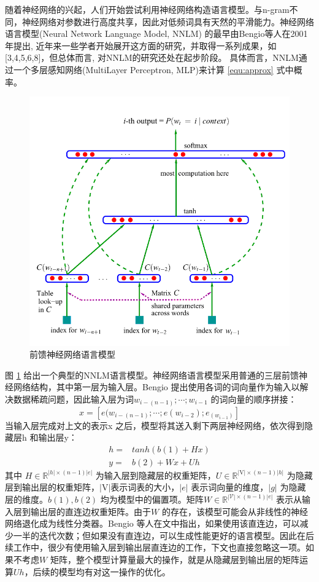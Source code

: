 \documentclass[12pt,a4paper]{article}
\begin{document}
随着神经网络的兴起，人们开始尝试利用神经网络构造语言模型。与n-gram不同，神经网络对参数进行高度共享，因此对低频词具有天然的平滑能力。神经网络语言模型(Neural Network Language Model, NNLM) 的最早由Bengio等人在2001年提出\cite{DBLP:conf/nips/BengioDV00}, 近年来一些学者开始展开这方面的研究，并取得一系列成果，如[3,4,5,6,8]，但总体而言, 对NNLM的研究还处在起步阶段。
具体而言，NNLM通过一个多层感知网络(MultiLayer Perceptron, MLP)来计算 \ref{equ:approx} 式中概率。
\begin{figure}
  \centering
  \includegraphics[width=0.7\linewidth]{./figures/nplm.png}
  \caption{前馈神经网络语言模型}\label{fig:nplm}
\end{figure}
图 \ref{fig:nplm} 给出一个典型的NNLM语言模型。神经网络语言模型采用普通的三层前馈神经网络结构，其中第一层为输入层。Bengio 提出使用各词的词向量作为输入以解决数据稀疏问题，因此输入层为词$w_{i-(n-1)}; \cdots;w_{i-1} $ 的词向量的顺序拼接：
\begin{equation}\label{equ:we}
  x = [e(w_{i-(n-1)}; \cdots ; e(w_{i-2}); e_{(w_{i-1})}]
\end{equation}
当输入层完成对上文的表示x 之后，模型将其送入剩下两层神经网络，依次得到隐藏层h 和输出层y：
\begin{equation}\label{equ:all_nplm}
\begin{split}
h =& tanh(b(1) + Hx) \\
y =& b(2) +Wx + Uh
\end{split}
\end{equation}
其中 $H \in \mathbb{R}^{|h| \times (n-1)|e|}$ 为输入层到隐藏层的权重矩阵，$U \in \mathbb{R}^{|\mathrm{V}|\times (n-1)|h|}$ 为隐藏层到输出层的权重矩阵，$ |\mathrm{V}|$表示词表的大小，$|e|$ 表示词向量的维度，$|g|$ 为隐藏层的维度。$b(1),b(2)$ 均为模型中的偏置项。矩阵$W \in \mathbb{R}^{|\mathcal{V}|\times (n-1)|e|}$ 表示从输入层到输出层的直连边权重矩阵。由于$W$ 的存在，该模型可能会从非线性的神经网络退化成为线性分类器。Bengio 等人在文中指出，如果使用该直连边，可以减少一半的迭代次数；但如果没有直连边，可以生成性能更好的语言模型。因此在后续工作中，很少有使用输入层到输出层直连边的工作，下文也直接忽略这一项。如果不考虑$W$ 矩阵，整个模型计算量最大的操作，就是从隐藏层到输出层的矩阵运算$Uh$，后续的模型均有对这一操作的优化。
\end{document}
